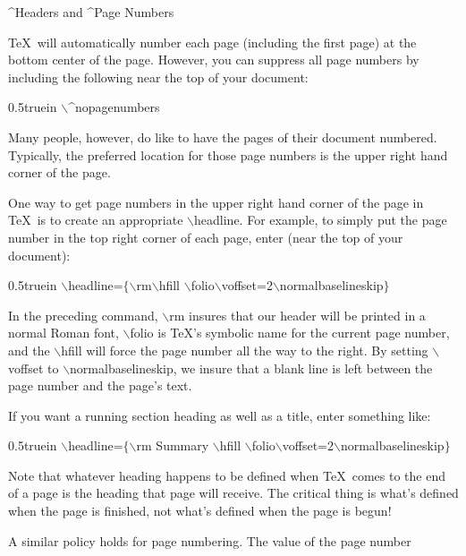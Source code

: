 \bigskip\bigskip\par\noindent
\centerline{\twlbf ^{Headers} and ^{Page Numbers}}
\bigskip\bigskip\par\noindent
\TeX\ will automatically number each page (including the first page)
at the bottom center of the page. However, you can suppress all page
numbers by including the following near the top of your document:
\bigskip\par\noindent\hglue 0.5truein
{\twltt $\backslash$^{nopagenumbers}}
\bigskip\par\noindent
Many people, however, {\twlbf do} like to have the pages of their document numbered.
Typically, the preferred location for those page numbers is the upper right
hand corner of the page.
\bigskip\par\noindent
One way to get page numbers 
in the upper right hand corner of the page
in \TeX\ is to create an appropriate 
{\twltt $\backslash$headline}. For example, to simply put the
page number in the top right corner of each page, enter (near the top
of your document):
\bigskip\par\noindent\hglue 0.5truein
{\twltt $\backslash$headline=$\{${}$\backslash$rm{}$\backslash$hfill%
$\backslash$folio$\backslash$voffset=2$\backslash$normalbaselineskip$\}$}
\bigskip\par\noindent
In the preceding command, {\twltt $\backslash$rm} insures
that our header will be printed in
a normal Roman font, {\twltt $\backslash$folio} is \TeX{}'s symbolic
name for the current page number, and the {\twltt $\backslash$hfill}
will force the page number all the way to the right. By
setting {\twltt $\backslash$voffset} to 
{$\backslash$normalbaselineskip},
we insure that a blank line is left between the page number and the
page's text.
\bigskip\par\noindent
If you want a running section heading as well as a title, 
enter something like:
\bigskip\par\noindent\hglue 0.5truein
{\twltt 
$\backslash$headline=$\{${}$\backslash$rm Summary $\backslash$hfill%
$\backslash$folio$\backslash$voffset=2$\backslash$normalbaselineskip$\}$}
\bigskip\par\noindent
Note that whatever heading happens to be defined when \TeX\ comes to the
{\twlbf end} of a page is the heading that page will receive. 
The critical
thing is what's defined when the page is {\twlbf finished}, not what's
defined when the page is {\twlbf begun}!
\bigskip\par\noindent
A similar policy holds for page numbering. The value of the page number
